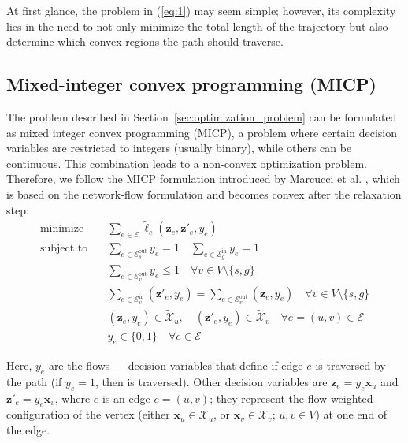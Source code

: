 At first glance, the problem in (\ref{eq:1}) may seem simple; however, its complexity lies in the need to not only minimize the total length of the trajectory but also determine which convex regions the path should traverse.


\subsection{Mixed-integer convex programming (MICP)}
\label{MICP_section}
The problem described in Section~\ref{sec:optimization_problem} can be formulated as mixed integer convex programming (MICP), a problem where certain decision variables are restricted to integers (usually binary), while others can be continuous. This combination leads to a non-convex optimization problem. Therefore, we follow the MICP formulation introduced by Marcucci et al. \cite{marcucci2024shortest}, which is based on the network-flow formulation and becomes convex after the relaxation step:
\begin{align}
\text{minimize} \quad & \sum_{e \in \mathcal{E}} \widetilde{\ell}_e(\mathbf{z}_e, \mathbf{z}'_e, y_e) \tag{2.1} \label{eq:2.1}\\
\text{subject to} \quad 
& \sum_{e \in \mathcal{E}_s^{\text{out}}} y_e = 1 \quad \sum_{e \in \mathcal{E}_g^{\text{in}}} y_e = 1 \tag{2.2} \\
& \sum_{e \in \mathcal{E}_v^{\text{out}}} y_e \le 1 \quad \forall v \in {V} \setminus \{s, g\} \tag{2.3} \\
& \sum_{e \in \mathcal{E}_v^{\text{in}}} (\mathbf{z}'_e, y_e) = \sum_{e \in \mathcal{E}_v^{\text{out}}} (\mathbf{z}_e, y_e) \quad \forall v \in {V} \setminus \{s, g\} \tag{2.4} \label{eq:2.4}\\
& (\mathbf{z}_e, y_e) \in \widetilde{\mathcal{X}}_u, \quad (\mathbf{z}'_e, y_e) \in \widetilde{\mathcal{X}}_v \quad \forall e = (u, v) \in \mathcal{E} \tag{2.5} \label{eq:2.5} \\
& y_e \in \{0, 1\} \quad \forall e \in \mathcal{E} \tag{2.6} \label{eq:2.6}
\end{align}

Here, \(y_e\) are the flows --- decision variables that define if edge \(e\) is traversed by the path (if \(y_e=1\), then is traversed). Other decision variables are $\mathbf{z}_e = y_e \mathbf{x}_u$ and $\mathbf{z}'_e = y_e \mathbf{x}_v$, where $e$ is an edge $e = (u,v)$; they represent the flow-weighted configuration of the vertex 
(either \(\mathbf{x}_u \in \mathcal{X}_u\), or \(\mathbf{x}_v \in \mathcal{X}_v\); \(u, v \in V\)) at one end of the edge.

